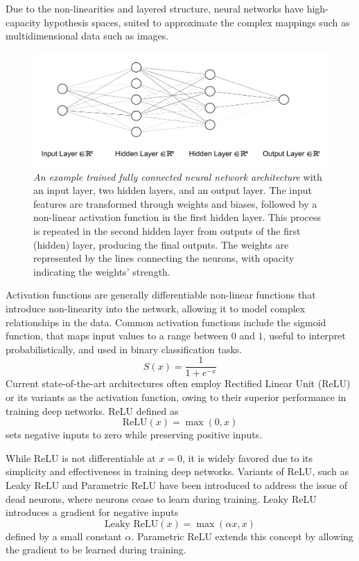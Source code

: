 Due to the non-linearities and layered structure, neural networks have high-capacity hypothesis spaces, suited to approximate the complex mappings such as multidimensional data such as images. 

\begin{figure}[h]
    \centering
    \includegraphics[width=1\linewidth]{images/simple_nn_architecture.pdf}
    \caption{\textit{An example trained fully connected neural network architecture} with an input layer, two hidden layers, and an output layer. The input features are transformed through weights and biases, followed by a non-linear activation function in the first hidden layer. This process is repeated in the second hidden layer from outputs of the first (hidden) layer, producing the final outputs. The weights are represented by the lines connecting the neurons, with opacity indicating the weights' strength.}
    \label{fig:simple-nn-architecture}
\end{figure}

Activation functions are generally differentiable non-linear functions that introduce non-linearity into the network, allowing it to model complex relationships in the data. Common activation functions include the sigmoid function, that maps input values to a range between $0$ and $1$, useful to interpret probabilistically, and used in binary classification tasks. 
\begin{equation}
    S(x) = \frac{1}{1 + e^{-x}}
\end{equation}
Current state-of-the-art architectures often employ Rectified Linear Unit (ReLU) or its variants as the activation function, owing to their superior performance in training deep networks. ReLU defined as
\begin{equation}
    \text{ReLU}(x) = \max(0, x)
\end{equation}
sets negative inputs to zero while preserving positive inputs.

While ReLU is not differentiable at $x = 0$, it is widely favored due to its simplicity and effectiveness in training deep networks. Variants of ReLU, such as Leaky ReLU and Parametric ReLU have been introduced to address the issue of dead neurons, where neurons cease to learn during training. Leaky ReLU introduces a gradient for negative inputs
\begin{equation}\label{eq:leaky-relu}
    \text{Leaky ReLU}(x) = \max(\alpha x, x)
\end{equation}
defined by a small constant $\alpha$. Parametric ReLU extends this concept by allowing the gradient to be learned during training.

